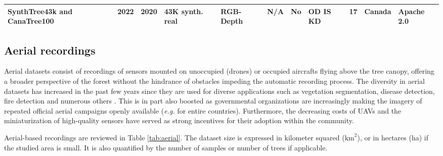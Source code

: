 \documentclass{CUP-JNL-DTM}%
\theoremstyle{definition}
\numberwithin{equation}{section}
\begin{document}
\begin{table*}[t!]
{\begin{fntable}
\begin{tabular}{p{1.5cm} | p{0.4cm} | p{1cm} | p{1.3cm} | p{1.2cm} : p{1cm} | p{0.4cm} | p{0.7cm} | p{0.8cm} | p{1cm} | p{1.1cm}}
SynthTree43k and CanaTree100 \cite{grondin_tree_2022} & 2022 & 2020  & 43K synth.  real & RGB-Depth & N/A & No & OD \newline IS \newline KD & 17 & Canada & Apache 2.0 \\

\bottomrule
\end{tabular}
\end{fntable}}
\label{tab:ground}
\end{table*}




\subsection{Aerial recordings}
\label{sec:review_aerial}

Aerial datasets consist of recordings of sensors mounted on unoccupied (drones) or occupied aircrafts flying above the tree canopy, offering a broader perspective of the forest without the hindrance of obstacles impeding the automatic recording process.
The diversity in aerial datasets has increased in the past few years since they are used for diverse applications such as vegetation segmentation, disease detection, fire detection and numerous others \cite{guimaraes_forestry_2020}. This is in part also boosted as governmental organizations are increasingly making the imagery of repeated official aerial campaigns openly available (\textit{e.g.} for entire countries). Furthermore, the decreasing costs of UAVs and the miniaturization of high-quality sensors have served as strong incentives for their adoption within the community.

Aerial-based recordings are reviewed in Table \ref{tab:aerial}. The dataset size is expressed in kilometer squared ($\text{km}^2$), or in hectares (ha) if the studied area is small. It is also quantified by the number of samples or number of trees if applicable.
\end{document}
